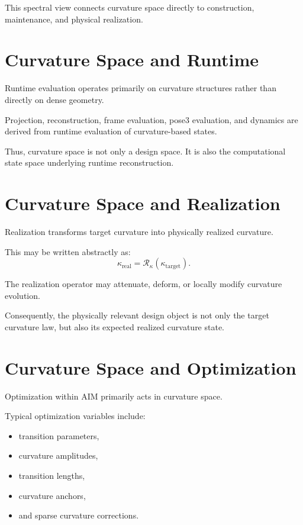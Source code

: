 This spectral view connects curvature space directly to construction,
maintenance, and physical realization.

\section{Curvature Space and Runtime}

Runtime evaluation operates primarily on curvature structures rather
than directly on dense geometry.

Projection, reconstruction, frame evaluation, pose3 evaluation, and
dynamics are derived from runtime evaluation of curvature-based states.

Thus, curvature space is not only a design space. It is also the
computational state space underlying runtime reconstruction.

\section{Curvature Space and Realization}

Realization transforms target curvature into physically realized
curvature.

This may be written abstractly as:
\[
\kappa_{\mathrm{real}}
=
\mathcal R_{\kappa}
(
\kappa_{\mathrm{target}}
).
\]

The realization operator may attenuate, deform, or locally modify
curvature evolution.

Consequently, the physically relevant design object is not only the
target curvature law, but also its expected realized curvature state.

\section{Curvature Space and Optimization}

Optimization within AIM primarily acts in curvature space.

Typical optimization variables include:
\begin{itemize}
\item transition parameters,
\item curvature amplitudes,
\item transition lengths,
\item curvature anchors,
\item and sparse curvature corrections.
\end{itemize}

